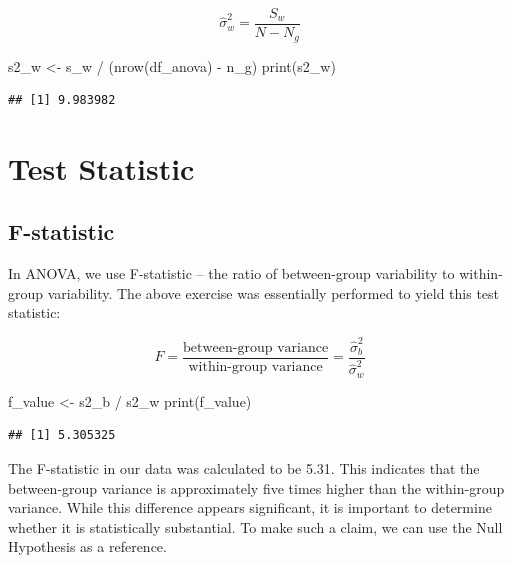 \documentclass[
]{book}
\newenvironment{Shaded}{\begin{snugshade}}{\end{snugshade}}
\newcommand{\FunctionTok}[1]{\textcolor[rgb]{0.00,0.00,0.00}{#1}}
\newcommand{\NormalTok}[1]{#1}
\newcommand{\OtherTok}[1]{\textcolor[rgb]{0.56,0.35,0.01}{#1}}
\newcommand{\SpecialCharTok}[1]{\textcolor[rgb]{0.00,0.00,0.00}{#1}}
\begin{document}
\[
\hat{\sigma}^2_w = \frac{S_w}{N-N_g}
\]

\begin{Shaded}
\begin{Highlighting}[]
\NormalTok{s2\_w }\OtherTok{\textless{}{-}}\NormalTok{ s\_w }\SpecialCharTok{/}\NormalTok{ (}\FunctionTok{nrow}\NormalTok{(df\_anova) }\SpecialCharTok{{-}}\NormalTok{ n\_g)}
\FunctionTok{print}\NormalTok{(s2\_w)}
\end{Highlighting}
\end{Shaded}

\begin{verbatim}
## [1] 9.983982
\end{verbatim}

\hypertarget{test-statistic-1}{%
\section{Test Statistic}\label{test-statistic-1}}

\hypertarget{f-statistic}{%
\subsection{F-statistic}\label{f-statistic}}

In ANOVA, we use F-statistic -- the ratio of between-group variability to within-group variability. The above exercise was essentially performed to yield this test statistic:

\[
F = \frac{\text{between-group variance}}{\text{within-group variance}} = \frac{\hat{\sigma}^2_b}{\hat{\sigma}^2_w}
\]

\begin{Shaded}
\begin{Highlighting}[]
\NormalTok{f\_value }\OtherTok{\textless{}{-}}\NormalTok{ s2\_b }\SpecialCharTok{/}\NormalTok{ s2\_w}
\FunctionTok{print}\NormalTok{(f\_value)}
\end{Highlighting}
\end{Shaded}

\begin{verbatim}
## [1] 5.305325
\end{verbatim}

The F-statistic in our data was calculated to be 5.31. This indicates that the between-group variance is approximately five times higher than the within-group variance. While this difference appears significant, it is important to determine whether it is statistically substantial. To make such a claim, we can use the Null Hypothesis as a reference.
\end{document}
